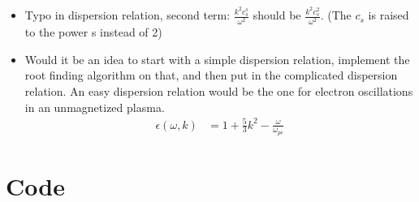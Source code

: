 \documentclass[x11names]{article}
\begin{document}
  \begin{itemize}
    \item Typo in dispersion relation, second term: \(\frac{k^2c_s^s}{\omega^2}\) should be \(\frac{k^2c_s^2}{\omega^2}\). (The \(c_s\) is raised to the power s instead of 2)
    \item Would it be an idea to start with a simple dispersion relation, implement the root finding algorithm on that, and then put in the complicated dispersion relation. An easy dispersion relation would be the one for electron oscillations in an unmagnetized plasma.
    \begin{align}
      \epsilon(\omega, k) &= 1 + \frac{5}{3}k^2 - \frac{\omega}{\omega_{pe}}
    \end{align}
  \end{itemize}



\section{Code}
  \label{sec:code}
  
\end{document}
